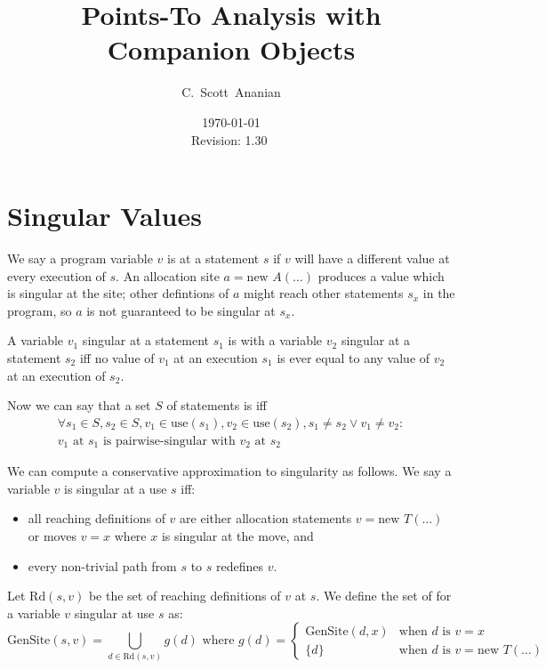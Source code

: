 \documentclass[11pt,notitlepage]{article}
\author{C.~Scott~Ananian}
\title{Points-To Analysis with Companion Objects}
\date{\today \\ $ $Revision: 1.30 $ $}
\begin{document}

\maketitle
\section{Singular Values}

We say a program variable $v$ is  at a statement $s$
if $v$ will have a different value at every execution of $s$.  An
allocation site $a = \text{new }A(\ldots)$ produces a value which is singular
at the site; other defintions of $a$ might reach other statements
$s_x$ in the program, so $a$ is not guaranteed to be singular at $s_x$.

A variable $v_1$ singular at a statement $s_1$ is
 with a variable $v_2$ singular at a statement
$s_2$ iff no value of $v_1$ at an execution $s_1$ is ever equal to any
value of $v_2$ at an execution of $s_2$.

Now we can say that a set $S$ of statements is
 iff
\begin{multline*}
\forall s_1 \in S, s_2 \in S, v_1 \in \text{use}(s_1), v_2 \in \text{use}(s_2),
  s_1 \neq s_2 \vee v_1 \neq v_2:
\\
v_1 \text{ at } s_1 \text{ is pairwise-singular with } v_2 \text{ at } s_2
\end{multline*}

We can compute a conservative approximation to singularity as follows.
We say a variable $v$ is singular at a use $s$ iff:
\begin{itemize}
\item all reaching definitions of $v$ are either allocation statements 
$v = \text{new }T(\ldots)$ or moves $v = x$ where $x$ is singular at
the move, and
\item every non-trivial path from $s$ to $s$ redefines $v$.
\end{itemize}

Let $\text{Rd}(s,v)$ be the set of reaching definitions of $v$ at $s$.
We define the set of  for a variable $v$ singular at
use $s$ as:
\begin{displaymath}
\text{GenSite}(s,v) %
 =
\bigcup_{d \in \text{Rd}(s,v)} g(d)
\text{ where }
g(d) = \begin{cases}
                \text{GenSite}(d,x) &\text{when } d \text{ is } v=x \\
                \{d\}&\text{when } d \text{ is } v=\text{new } T(\ldots)
       \end{cases}
\end{displaymath}
\end{document}
